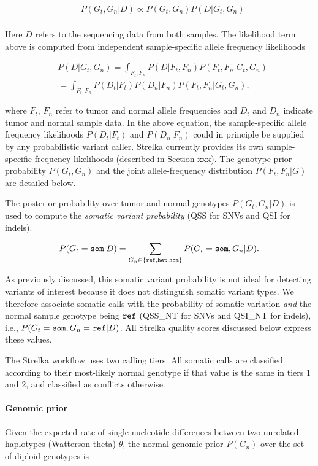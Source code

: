 \documentclass{article}
\begin{document}
\begin{align*}
	& P(G_t,G_n|D) \propto P(G_t,G_n) P(D|G_t,G_n) \\
\end{align*}


Here $D$ refers to the sequencing data from both samples. The likelihood term above is computed from independent sample-specific allele frequency likelihoods

\begin{align*}
	& P(D|G_t,G_n) = \int_{F_t,F_n}{P(D|F_t,F_n)P(F_t,F_n|G_t,G_n)} \\
	& = \int_{F_t,F_n}{P(D_t|F_t)P(D_n|F_n)P(F_t,F_n|G_t,G_n)},
\end{align*}

\noindent where $F_t$, $F_n$ refer to tumor and normal allele frequencies and $D_t$ and $D_n$ indicate tumor and normal sample data. In the above equation, the sample-specific allele frequency likelihoods $P(D_t|F_t)$ and $P(D_n|F_n)$ could in principle be supplied by any probabilistic variant caller. Strelka currently provides its own sample-specific frequency likelihoods (described in Section xxx). The genotype prior probability $P(G_t, G_n)$ and the joint allele-frequency distribution $P(F_t,F_n|G)$ are detailed below.

The posterior probability over tumor and normal genotypes $P(G_t,G_n|D)$ is used to compute the {\em somatic variant probability} (QSS for SNVs and QSI for indels).

\begin{equation*}
	P(G_t = {\tt som} | D) = \sum_{G_n \in \{ {\tt ref}, {\tt het}, \tt{hom} \}}{P(G_t={\tt som},G_n|D)}.
\end{equation*}

As previously discussed, this somatic variant probability is not ideal for detecting variants of interest because it does not distinguish somatic variant types. We therefore associate somatic calls with the probability of somatic variation {\em and} the normal sample genotype being $\tt ref$ (QSS\_NT for SNVs and QSI\_NT for indels), i.e., $P(G_t = {\tt som}, G_n = {\tt ref} | D)$. All Strelka quality scores discussed below express these values.

The Strelka workflow uses two calling tiers. All somatic calls are classified according to their most-likely normal genotype if that value is the same in tiers 1 and 2, and classified as conflicts otherwise.

\paragraph{Genomic prior}
Given the expected rate of single nucleotide differences between two unrelated haplotypes (Watterson theta) $\theta$, the normal genomic prior $P(G_n)$ over the set of diploid genotypes is
\end{document}
